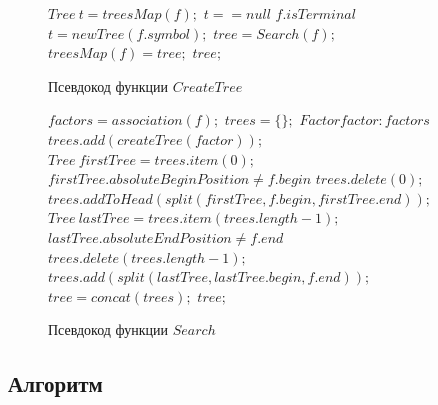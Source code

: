 \documentclass[12pt,a4paper]{extarticle}
\theoremstyle{break}
\begin{document}
\begin{figure}[!h]
	\begin{center}
	  \begin{varwidth}{\linewidth}
		\begin{codebox}
				\li $Tree\ t = treesMap(f);$
				\li \If $t == null$ 
				\li		\Then
				\li		\If $f.isTerminal$ 
				\li			\Then 
				\li				$t = newTree(f.symbol);$
				\li			\Else 
				\li				$tree = Search(f);$ 
						\End
				\li				$treesMap(f) = tree;$	
					\End
				\li	\Return $tree;$
		\end{codebox}
		\caption{Псевдокод функции $CreateTree$}
		\label{createtree}
	  \end{varwidth}
	\end{center}
\end{figure}


\begin{figure}[!h]
	\begin{center}
	  \begin{varwidth}{\linewidth}
		\begin{codebox}
			\Procname{$\proc{Search}(f)$}
				\li	$factors = association(f);$
				\li	$trees = \{\};$
				\li	\For $Factor factor : factors$
				\li		\Do
				\li		$trees.add(createTree(factor));$
						\End
				\li	$Tree\ firstTree = trees.item(0);$
				\li \If $firstTree.absoluteBeginPosition \neq f.begin$
				\li		\Then 
				\li		$trees.delete(0);$
				\li		$trees.addToHead(split(firstTree, f.begin, firstTree.end));$
					\End
				\li	$Tree\ lastTree = trees.item(trees.length - 1);$
				\li \If $lastTree.absoluteEndPosition \neq f.end$
				\li 	\Then 
				\li		$trees.delete(trees.length - 1);$
				\li		$trees.add(split(lastTree, lastTree.begin, f.end));$
				 	\End
				\li	$tree = concat(trees);$ 	
				\li \Return $tree;$
		\end{codebox}
		\caption{Псевдокод функции $Search$}
		\label{search}
	  \end{varwidth}
	\end{center}
\end{figure}


\newpage
\subsection{Алгоритм}
\end{document}
